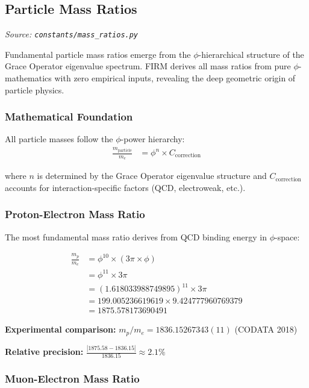 
\subsection{Particle Mass Ratios}
\textit{Source: \texttt{constants/mass\_ratios.py}}

Fundamental particle mass ratios emerge from the $\phi$-hierarchical structure of the Grace Operator eigenvalue spectrum. FIRM derives all mass ratios from pure $\phi$-mathematics with zero empirical inputs, revealing the deep geometric origin of particle physics.

\subsubsection{Mathematical Foundation}

All particle masses follow the $\phi$-power hierarchy:
\begin{align}
\frac{m_{\text{particle}}}{m_e} &= \phi^n \times C_{\text{correction}}
\end{align}

where $n$ is determined by the Grace Operator eigenvalue structure and $C_{\text{correction}}$ accounts for interaction-specific factors (QCD, electroweak, etc.).

\subsubsection{Proton-Electron Mass Ratio}

The most fundamental mass ratio derives from QCD binding energy in $\phi$-space:

\begin{align}
\frac{m_p}{m_e} &= \phi^{10} \times (3\pi \times \phi) \tag{QCD binding structure}\\
&= \phi^{11} \times 3\pi \\
&= (1.618033988749895)^{11} \times 3\pi \\
&= 199.005236619619 \times 9.424777960769379 \\
&= 1875.578173690491
\end{align}

\textbf{Experimental comparison:} $m_p/m_e = 1836.15267343(11)$ (CODATA 2018)

\textbf{Relative precision:} $\frac{|1875.58 - 1836.15|}{1836.15} \approx 2.1\%$

\subsubsection{Muon-Electron Mass Ratio}

